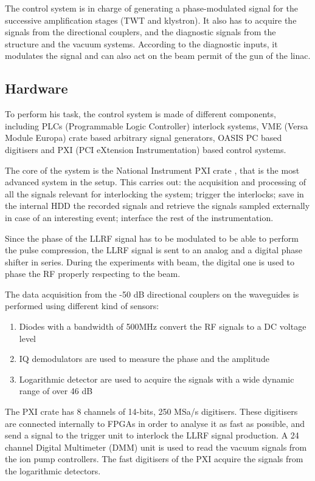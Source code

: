 The control system is in charge of generating a phase-modulated signal for the successive amplification stages (TWT and klystron). It also has to acquire the signals from the directional couplers, and the diagnostic signals from the structure and the vacuum systems. According to the diagnostic inputs, it modulates the signal and can also act on the beam permit of the gun of the linac. 

\subsection[Hardware]{Hardware}

To perform his task, the control system is made of different components, including PLCs (Programmable Logic Controller) interlock systems,  VME (Versa Module Europa) crate based arbitrary signal generators, OASIS PC \cite{OASIS} based digitisers and PXI (PCI eXtension Instrumentation) based control systems.

The core of the system is the National Instrument PXI crate \cite{NI:PXI}, that is the most advanced system in the setup. This carries out: the acquisition and processing of all the signals relevant for interlocking the system; trigger the interlocks; save in the internal HDD the recorded signals and retrieve the signals sampled externally in case of an interesting event; interface the rest of the instrumentation.

Since the phase of the LLRF signal has to be modulated to be able to perform the pulse compression, the LLRF signal is sent to an analog and a digital phase shifter in series. During the experiments with beam, the digital one is used to phase the RF properly respecting to the beam.

The data acquisition from the -50 dB directional couplers on the waveguides is performed using different kind of sensors:
\begin{enumerate}
\item Diodes with a bandwidth of 500MHz convert the RF signals to a DC voltage level
\item IQ demodulators are used to measure the phase and the amplitude
\item Logarithmic detector are used to acquire the signals with a wide dynamic range of over 46 dB
\end{enumerate}

The PXI crate has 8 channels of 14-bits, 250 MSa/s digitisers. These digitisers are connected internally to FPGAs in order to analyse it as fast as possible, and send a signal to the trigger unit to interlock the LLRF signal production. A 24 channel Digital Multimeter (DMM) unit is used to read the vacuum signals from the ion pump controllers. The fast digitisers of the PXI acquire the signals from the logarithmic detectors. 

